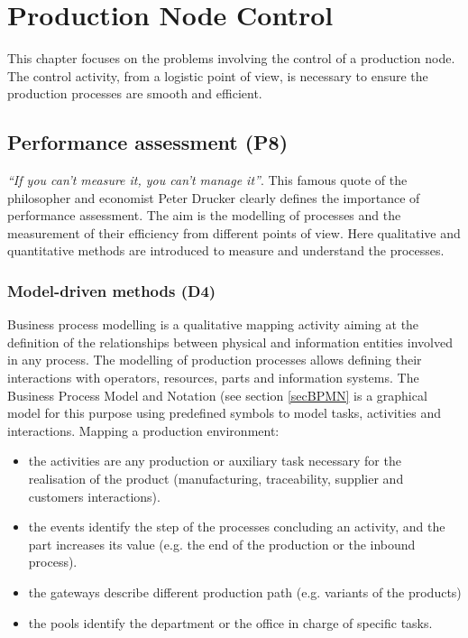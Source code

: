\chapter{Production Node Control} \label{chapProdControl}

This chapter focuses on the problems involving the control of a production node. The control activity, from a logistic point of view, is necessary to ensure the production processes are smooth and efficient. 

\section{Performance assessment (P8)}
\textit{“If you can’t measure it, you can’t manage it”}. This famous quote of the philosopher and economist Peter Drucker clearly defines the importance of performance assessment. The aim is the modelling of processes and the measurement of their efficiency from different points of view. Here qualitative and quantitative methods are introduced to measure and understand the processes.

\subsection{Model-driven methods (D4)}

Business process modelling is a qualitative mapping activity aiming at the definition of the relationships between physical and information entities involved in any process. The modelling of production processes allows defining their interactions with operators, resources, parts and information systems. The Business Process Model and Notation (see section \ref{secBPMN} is a graphical model for this purpose using predefined symbols to model tasks, activities and interactions. Mapping a production environment:

\begin{itemize}
    \item the activities are any production or auxiliary task necessary for the realisation of the product (manufacturing, traceability, supplier and customers interactions).
    \item the events identify the step of the processes concluding an activity, and the part increases its value (e.g. the end of the production or the inbound process).
    \item the gateways describe different production path (e.g. variants of the products)
    \item the pools identify the department or the office in charge of specific tasks.

\end{itemize}

